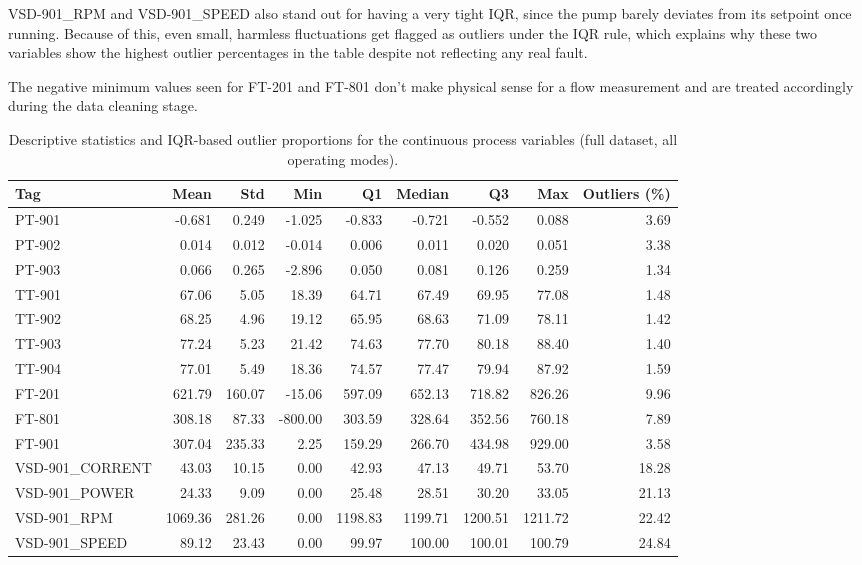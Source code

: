 VSD-901\_RPM and VSD-901\_SPEED also stand out for having a very tight IQR, since the pump barely 
deviates from its setpoint once running. Because of this, even small, harmless fluctuations get flagged 
as outliers under the IQR rule, which explains why these two variables show the highest outlier 
percentages in the table despite not reflecting any real fault.

The negative minimum values seen for FT-201 and FT-801 don't make physical sense for a flow measurement 
and are treated accordingly during the data cleaning stage.

\begin{table}[htbp]
\centering
\caption{Descriptive statistics and IQR-based outlier proportions for the continuous process variables 
(full dataset, all operating modes).}
\label{tab:eda_summary}
\scriptsize
\begin{tabular}{lrrrrrrrr}
\hline
\textbf{Tag} & \textbf{Mean} & \textbf{Std} & \textbf{Min} & \textbf{Q1} & \textbf{Median} & \textbf{Q3} & \textbf{Max} & \textbf{Outliers (\%)} \\
\hline
PT-901           & -0.681  & 0.249  & -1.025  & -0.833  & -0.721  & -0.552  & 0.088    & 3.69  \\
PT-902           & 0.014   & 0.012  & -0.014  & 0.006   & 0.011   & 0.020   & 0.051    & 3.38  \\
PT-903           & 0.066   & 0.265  & -2.896  & 0.050   & 0.081   & 0.126   & 0.259    & 1.34  \\
TT-901           & 67.06   & 5.05   & 18.39   & 64.71   & 67.49   & 69.95   & 77.08    & 1.48  \\
TT-902           & 68.25   & 4.96   & 19.12   & 65.95   & 68.63   & 71.09   & 78.11    & 1.42  \\
TT-903           & 77.24   & 5.23   & 21.42   & 74.63   & 77.70   & 80.18   & 88.40    & 1.40  \\
TT-904           & 77.01   & 5.49   & 18.36   & 74.57   & 77.47   & 79.94   & 87.92    & 1.59  \\
FT-201           & 621.79  & 160.07 & -15.06  & 597.09  & 652.13  & 718.82  & 826.26   & 9.96  \\
FT-801           & 308.18  & 87.33  & -800.00 & 303.59  & 328.64  & 352.56  & 760.18   & 7.89  \\
FT-901           & 307.04  & 235.33 & 2.25    & 159.29  & 266.70  & 434.98  & 929.00   & 3.58  \\
VSD-901\_CORRENT & 43.03   & 10.15  & 0.00    & 42.93   & 47.13   & 49.71   & 53.70    & 18.28 \\
VSD-901\_POWER   & 24.33   & 9.09   & 0.00    & 25.48   & 28.51   & 30.20   & 33.05    & 21.13 \\
VSD-901\_RPM     & 1069.36 & 281.26 & 0.00    & 1198.83 & 1199.71 & 1200.51 & 1211.72  & 22.42 \\
VSD-901\_SPEED   & 89.12   & 23.43  & 0.00    & 99.97   & 100.00  & 100.01  & 100.79   & 24.84 \\
\hline
\end{tabular}
\end{table}

